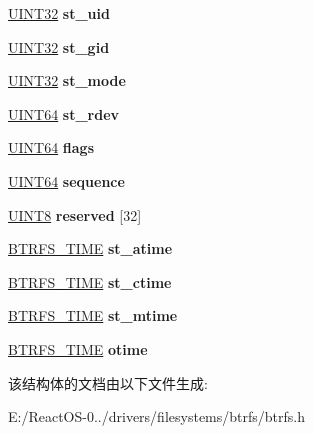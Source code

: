 \begin{DoxyCompactItemize}
\hyperlink{_processor_bind_8h_ae1e6edbbc26d6fbc71a90190d0266018}{U\+I\+N\+T32} {\bfseries st\+\_\+uid}
\item 
\mbox{\label{struct_i_n_o_d_e___i_t_e_m_a3e90d92517800d3ec80c3174ed445e56}} 
\hyperlink{_processor_bind_8h_ae1e6edbbc26d6fbc71a90190d0266018}{U\+I\+N\+T32} {\bfseries st\+\_\+gid}
\item 
\mbox{\label{struct_i_n_o_d_e___i_t_e_m_ab92ed50facb46799e6e5534c28482322}} 
\hyperlink{_processor_bind_8h_ae1e6edbbc26d6fbc71a90190d0266018}{U\+I\+N\+T32} {\bfseries st\+\_\+mode}
\item 
\mbox{\label{struct_i_n_o_d_e___i_t_e_m_a8381cace07c318047fa1f96ea609d2e3}} 
\hyperlink{_processor_bind_8h_a57be03562867144161c1bfee95ca8f7c}{U\+I\+N\+T64} {\bfseries st\+\_\+rdev}
\item 
\mbox{\label{struct_i_n_o_d_e___i_t_e_m_a6939f48b291ec729ddc1fa04834a27ef}} 
\hyperlink{_processor_bind_8h_a57be03562867144161c1bfee95ca8f7c}{U\+I\+N\+T64} {\bfseries flags}
\item 
\mbox{\label{struct_i_n_o_d_e___i_t_e_m_a09482a91b94192f899f56f13f758044b}} 
\hyperlink{_processor_bind_8h_a57be03562867144161c1bfee95ca8f7c}{U\+I\+N\+T64} {\bfseries sequence}
\item 
\mbox{\label{struct_i_n_o_d_e___i_t_e_m_a2b42a7164ca398e067ea13385f21348f}} 
\hyperlink{_processor_bind_8h_ab27e9918b538ce9d8ca692479b375b6a}{U\+I\+N\+T8} {\bfseries reserved} \mbox{[}32\mbox{]}
\item 
\mbox{\label{struct_i_n_o_d_e___i_t_e_m_ab64838bf7a1a7e4721d771d48e64f593}} 
\hyperlink{struct_b_t_r_f_s___t_i_m_e}{B\+T\+R\+F\+S\+\_\+\+T\+I\+ME} {\bfseries st\+\_\+atime}
\item 
\mbox{\label{struct_i_n_o_d_e___i_t_e_m_ad1d12cd13a01270ae7f89b9c6df54303}} 
\hyperlink{struct_b_t_r_f_s___t_i_m_e}{B\+T\+R\+F\+S\+\_\+\+T\+I\+ME} {\bfseries st\+\_\+ctime}
\item 
\mbox{\label{struct_i_n_o_d_e___i_t_e_m_a84425cce00454c83604ce2ee245134cf}} 
\hyperlink{struct_b_t_r_f_s___t_i_m_e}{B\+T\+R\+F\+S\+\_\+\+T\+I\+ME} {\bfseries st\+\_\+mtime}
\item 
\mbox{\label{struct_i_n_o_d_e___i_t_e_m_a7d117dcf8beb0968764b422addda2e9d}} 
\hyperlink{struct_b_t_r_f_s___t_i_m_e}{B\+T\+R\+F\+S\+\_\+\+T\+I\+ME} {\bfseries otime}
\end{DoxyCompactItemize}


该结构体的文档由以下文件生成\+:\begin{DoxyCompactItemize}
\item 
E\+:/\+React\+O\+S-\/0../drivers/filesystems/btrfs/btrfs.\+h\end{DoxyCompactItemize}

